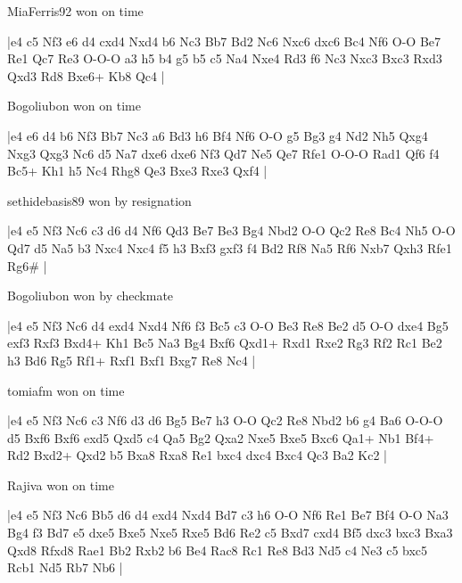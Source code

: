 \showboard

MiaFerris92 won on time

\makegametitle
|e4 c5 Nf3 e6 d4 cxd4 Nxd4 b6 Nc3 Bb7 Bd2 Nc6 Nxc6 dxc6 Bc4 Nf6 O-O Be7 Re1 Qc7 Re3 O-O-O a3 h5 b4 g5 b5 c5 Na4 Nxe4 Rd3 f6 Nc3 Nxc3 Bxc3 Rxd3 Qxd3 Rd8 Bxe6+ Kb8 Qc4  |

\showboard

Bogoliubon won on time

\makegametitle
|e4 e6 d4 b6 Nf3 Bb7 Nc3 a6 Bd3 h6 Bf4 Nf6 O-O g5 Bg3 g4 Nd2 Nh5 Qxg4 Nxg3 Qxg3 Nc6 d5 Na7 dxe6 dxe6 Nf3 Qd7 Ne5 Qe7 Rfe1 O-O-O Rad1 Qf6 f4 Bc5+ Kh1 h5 Nc4 Rhg8 Qe3 Bxe3 Rxe3 Qxf4  |

\showboard

sethidebasis89 won by resignation

\makegametitle
|e4 e5 Nf3 Nc6 c3 d6 d4 Nf6 Qd3 Be7 Be3 Bg4 Nbd2 O-O Qc2 Re8 Bc4 Nh5 O-O Qd7 d5 Na5 b3 Nxc4 Nxc4 f5 h3 Bxf3 gxf3 f4 Bd2 Rf8 Na5 Rf6 Nxb7 Qxh3 Rfe1 Rg6\#  |

\showboard

Bogoliubon won by checkmate

\makegametitle
|e4 e5 Nf3 Nc6 d4 exd4 Nxd4 Nf6 f3 Bc5 c3 O-O Be3 Re8 Be2 d5 O-O dxe4 Bg5 exf3 Rxf3 Bxd4+ Kh1 Bc5 Na3 Bg4 Bxf6 Qxd1+ Rxd1 Rxe2 Rg3 Rf2 Rc1 Be2 h3 Bd6 Rg5 Rf1+ Rxf1 Bxf1 Bxg7 Re8 Nc4  |

\showboard

tomiafm won on time

\makegametitle
|e4 e5 Nf3 Nc6 c3 Nf6 d3 d6 Bg5 Be7 h3 O-O Qc2 Re8 Nbd2 b6 g4 Ba6 O-O-O d5 Bxf6 Bxf6 exd5 Qxd5 c4 Qa5 Bg2 Qxa2 Nxe5 Bxe5 Bxc6 Qa1+ Nb1 Bf4+ Rd2 Bxd2+ Qxd2 b5 Bxa8 Rxa8 Re1 bxc4 dxc4 Bxc4 Qc3 Ba2 Kc2  |

\showboard

Rajiva won on time

\makegametitle
|e4 e5 Nf3 Nc6 Bb5 d6 d4 exd4 Nxd4 Bd7 c3 h6 O-O Nf6 Re1 Be7 Bf4 O-O Na3 Bg4 f3 Bd7 e5 dxe5 Bxe5 Nxe5 Rxe5 Bd6 Re2 c5 Bxd7 cxd4 Bf5 dxc3 bxc3 Bxa3 Qxd8 Rfxd8 Rae1 Bb2 Rxb2 b6 Be4 Rac8 Rc1 Re8 Bd3 Nd5 c4 Ne3 c5 bxc5 Rcb1 Nd5 Rb7 Nb6  |

